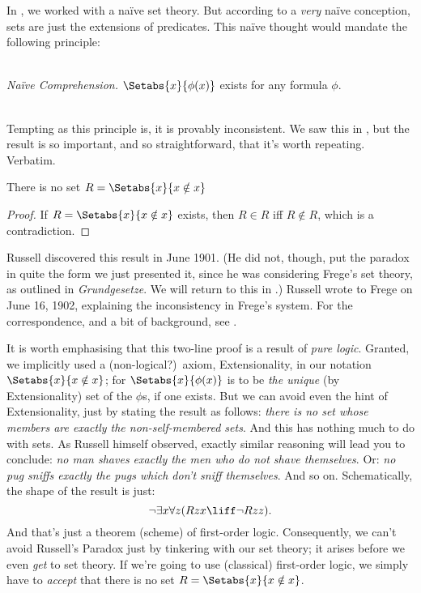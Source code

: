 \documentclass[../../../include/open-logic-section]{subfiles}
\begin{document}

In , we worked with a na\"{i}ve set theory. But
according to a \emph{very} na\"{i}ve conception, sets are just the
extensions of predicates. This na\"ive thought would mandate the
following principle:

\
\\\emph{Na\"{i}ve Comprehension.} $\Setabs{x}{\phi(x)}$ exists for any formula $\phi$.

\
\\Tempting as this principle is, it is provably inconsistent. We saw this in , but the result is so important, and so straightforward, that it's worth repeating. Verbatim.

\begin{thm}
There is no set $R = \Setabs{x}{x \notin x}$
\end{thm}

\begin{proof}
If $R = \Setabs{x}{x \notin x}$ exists, then
$R \in R$ iff $R \notin R$, which is a contradiction.
\end{proof}

Russell discovered this result in June 1901. (He did not, though, put
the paradox in quite the form we just presented it, since he was
considering Frege's set theory, as outlined in \emph{Grundgesetze}. We
will return to this in \olref[blv]{sec}.) Russell wrote to
Frege on June 16, 1902, explaining the inconsistency in Frege's
system. For the correspondence, and a bit of background, see
\citet[pp.~124--8]{Heijenoort1967}. 

It is worth emphasising that this two-line proof is a result of
\emph{pure logic}. Granted, we implicitly used a (non-logical?)\ axiom, Extensionality, in our notation $\Setabs{x}{x \notin x}$; for $\Setabs{x}{\phi(x)}$ is to be \emph{the unique} (by Extensionality) set of the $\phi$s, if one exists. But we can avoid even the hint of Extensionality, just by stating the result as follows:
\emph{there is no set whose members are exactly the non-self-membered
sets}. And this has nothing much to do with sets. As Russell himself observed, exactly similar reasoning
will lead you to conclude: \emph{no man shaves exactly the men who do
not shave themselves}. Or: \emph{no pug sniffs exactly the pugs which
don't sniff themselves}. And so on. Schematically, the shape of the
result is just: 
\[
\lnot \exists x \forall z(Rzx \liff \lnot R zz).
\]
And that's just a theorem (scheme) of first-order logic. Consequently,
we can't avoid Russell's Paradox just by tinkering with our set
theory; it arises before we even \emph{get} to set theory. If we're
going to use (classical) first-order logic, we simply have to
\emph{accept} that there is no set $R = \Setabs{x}{x\notin x}$. 
\end{document}

